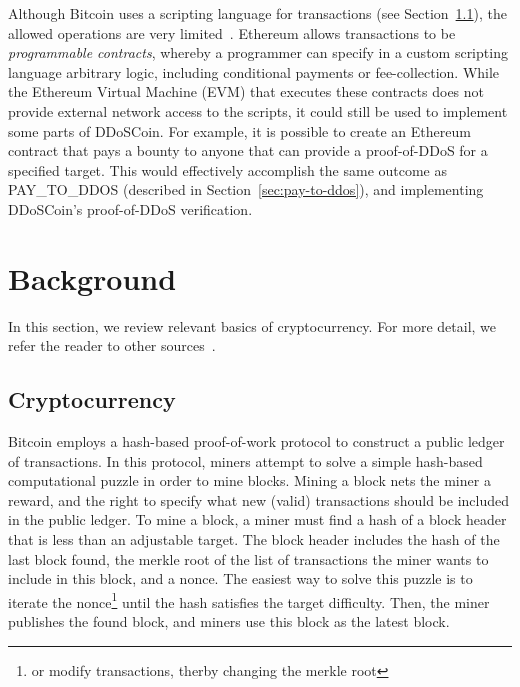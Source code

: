 Although Bitcoin uses a scripting language for transactions (see
Section~\ref{sec:scripting}), the allowed operations are very
limited~\cite{bitcoin-paper}. Ethereum allows transactions to be
\emph{programmable contracts}, whereby a programmer can specify in a custom
scripting language arbitrary logic, including conditional payments or
fee-collection. While the Ethereum Virtual Machine (EVM) that executes these
contracts does not provide external network access to the scripts, it could
still be used to implement some parts of DDoSCoin. For example, it is possible
to create an Ethereum contract that pays a bounty to anyone that can provide a
proof-of-DDoS for a specified target. This would effectively accomplish the same
outcome as PAY\_TO\_DDOS (described in Section~\ref{sec:pay-to-ddos}), and
implementing DDoSCoin's proof-of-DDoS verification.


\section{Background}

In this section, we review relevant basics of cryptocurrency. For more
detail, we refer the reader to other
sources~\cite{bitcoin-book,bitcoin-paper,bitcoin-sok}.

\subsection{Cryptocurrency}
\label{sec:scripting}
\FigTx

Bitcoin employs a hash-based proof-of-work protocol to construct a public ledger
of transactions. In this protocol, miners attempt to solve a simple hash-based
computational puzzle in order to mine blocks. Mining a block nets the miner a
reward, and the right to specify what new (valid) transactions should be
included in the public ledger. To mine a block, a miner must find a hash of a
block header that is less than an adjustable target. The block header includes
the hash of the last block found, the merkle root of the list of transactions
the miner wants to include in this block, and a nonce. The easiest way to solve
this puzzle is to iterate the nonce\footnote{or modify transactions, therby
changing the merkle root} until the hash satisfies the target difficulty. Then,
the miner publishes the found block, and miners use this block as the latest
block.

